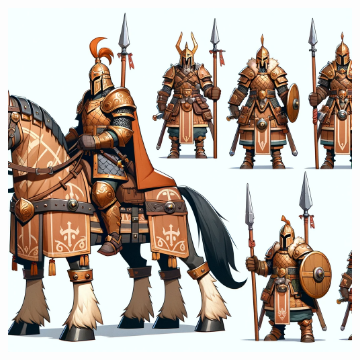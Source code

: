 \documentclass[a4paper,10pt,english]{article}
\begin{document}
\begin{figure}[h]
\begin{subfigure}{0.29\linewidth}
\label{Fig:Style1B}
\end{subfigure}\hfill
%
\begin{subfigure}{0.29\linewidth}
\includegraphics[width=\linewidth]{cavalry.png}
\label{Fig:Style1C}
\end{subfigure}

\end{figure}
\end{document}
